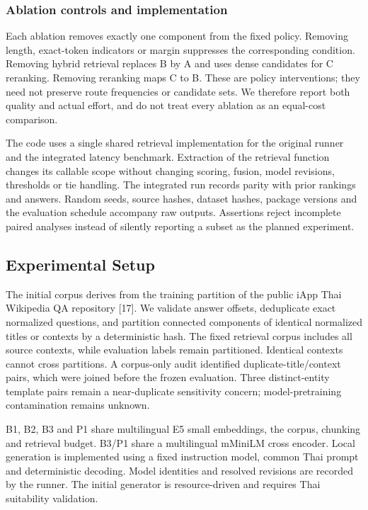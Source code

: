 \documentclass[10pt,a4paper]{article}
\begin{document}
\hypertarget{ablation-controls-and-implementation}{%
\subsubsection{Ablation controls and
implementation}\label{ablation-controls-and-implementation}}

Each ablation removes exactly one component from the fixed policy.
Removing length, exact-token indicators or margin suppresses the
corresponding condition. Removing hybrid retrieval replaces B by A and
uses dense candidates for C reranking. Removing reranking maps C to B.
These are policy interventions; they need not preserve route frequencies
or candidate sets. We therefore report both quality and actual effort,
and do not treat every ablation as an equal-cost comparison.

The code uses a single shared retrieval implementation for the original
runner and the integrated latency benchmark. Extraction of the retrieval
function changes its callable scope without changing scoring, fusion,
model revisions, thresholds or tie handling. The integrated run records
parity with prior rankings and answers. Random seeds, source hashes,
dataset hashes, package versions and the evaluation schedule accompany
raw outputs. Assertions reject incomplete paired analyses instead of
silently reporting a subset as the planned experiment.

\hypertarget{experimental-setup}{%
\subsection{Experimental Setup}\label{experimental-setup}}

The initial corpus derives from the training partition of the public
iApp Thai Wikipedia QA repository [17]. We validate answer
offsets, deduplicate exact normalized questions, and partition connected
components of identical normalized titles or contexts by a deterministic
hash. The fixed retrieval corpus includes all source contexts, while
evaluation labels remain partitioned. Identical contexts cannot cross
partitions. A corpus-only audit identified duplicate-title/context
pairs, which were joined before the frozen evaluation. Three
distinct-entity template pairs remain a near-duplicate sensitivity
concern; model-pretraining contamination remains unknown.

B1, B2, B3 and P1 share multilingual E5 small embeddings, the corpus,
chunking and retrieval budget. B3/P1 share a multilingual mMiniLM cross
encoder. Local generation is implemented using a fixed instruction
model, common Thai prompt and deterministic decoding. Model identities
and resolved revisions are recorded by the runner. The initial generator
is resource-driven and requires Thai suitability validation.
\end{document}

